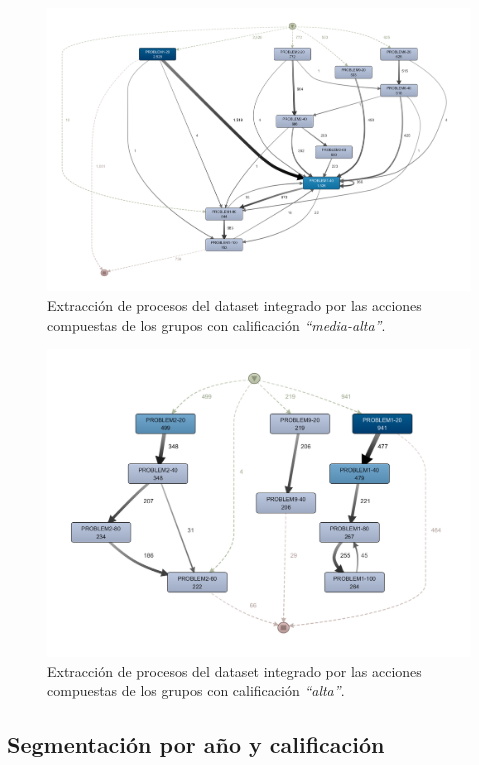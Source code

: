 \begin{figure}[H]
    \centering
    \includegraphics[width=1.25\textwidth]{imagenes/DISCO_compound/MidHighGrades.png}
    \caption{Extracción de procesos del dataset integrado por las acciones compuestas de los grupos con calificación \emph{``media-alta''}.}
    \label{fig:midHighGrades}
\end{figure}

\begin{figure}[H]
    \centering
    \includegraphics[width=1.25\textwidth]{imagenes/DISCO_compound/BestGrades.png}
    \caption{Extracción de procesos del dataset integrado por las acciones compuestas de los grupos con calificación \emph{``alta''}.}
    \label{fig:bestGrades}
\end{figure}


\subsection{Segmentación por año y calificación}

